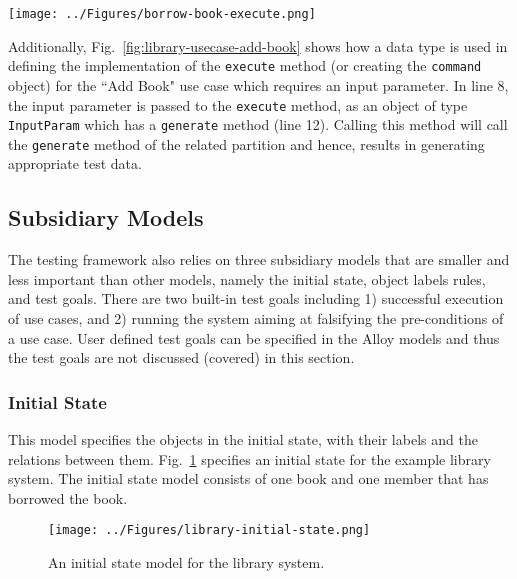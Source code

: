 \begin{figure*}[h]
\centering
\texttt{[image: ../Figures/borrow-book-execute.png]}
\caption{Implementation of the \texttt{Command} interface for ``Borrow Book" use case.}
\label{fig:library-borrow-book-execute}
\end{figure*}

Additionally, Fig.~\ref{fig:library-usecase-add-book} shows how a data type is used in defining the implementation of the \texttt{execute} method (or creating the \texttt{command} object) for the ``Add Book" use case which requires an input parameter.  In line 8, the input parameter is passed to the \texttt{execute} method, as an object of type \texttt{InputParam} which has a \texttt{generate} method (line 12). Calling this method will call the \texttt{generate} method of the related partition and hence, results in generating appropriate test data. 

\subsection{Subsidiary Models}
\label{sec:create-test model-subsidiary-models}
The testing framework also relies on three subsidiary models that are smaller and less important than other models, namely the initial state, object labels rules, and test goals. There are two built-in test goals including 1) successful execution of use cases, and 2) running the system aiming at falsifying the pre-conditions of a use case. User defined test goals can be specified in the Alloy models and thus the test goals are not discussed (covered) in this section.

\subsubsection{Initial State}
\label{sec:subsidiary-models-initial-state}
This model specifies the objects in the initial state, with their labels and the relations between them. Fig.~\ref{fig:library-initial-state} specifies an initial state for the example library system. The initial state model consists of one book and one member that has borrowed the book.

\begin{figure}[h]
\centering
\texttt{[image: ../Figures/library-initial-state.png]}
\caption{An initial state model for the library system.}
\label{fig:library-initial-state}
\end{figure}

